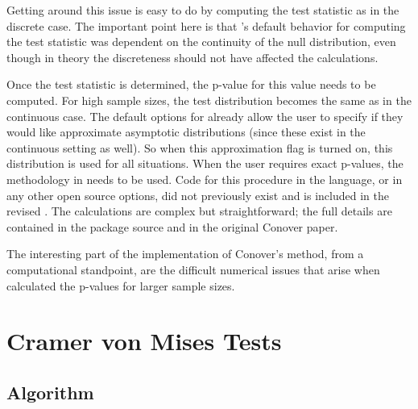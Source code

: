 \documentclass[article]{jss}
\begin{document}
Getting around this
issue is easy to do by computing the test statistic as  in the discrete case. The important point here is that 's
default behavior for computing the test statistic was dependent on the continuity of the null distribution, even though in theory the discreteness
should not have affected the calculations. 

Once the test statistic is determined, the p-value for this value needs to be computed. For high sample sizes, the test distribution becomes the same as in the
continuous case. The default options for  already allow the user to specify if they would like approximate asymptotic distributions (since these exist
in the continuous setting as well). So when this approximation flag is turned on, this distribution is used for all situations. When the user requires exact p-values,
the methodology in \citet{Conover1972} needs to be used. Code for this procedure in the  language, or in any other open source options, did not previously
exist and is included in the revised . The calculations are complex but straightforward; the full details are contained in the package source and in 
the original Conover paper. 

The interesting part of the implementation of Conover's method, from a computational standpoint, are the difficult numerical issues that arise when calculated the p-values for larger sample sizes. 

\section{Cramer von Mises Tests}

\subsection{Algorithm}
\end{document}
